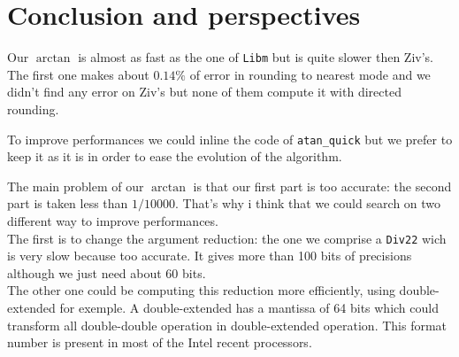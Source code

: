 \section{Conclusion and perspectives}

Our $\arctan$ is almost as fast as the one of \texttt{Libm} but is quite
slower then Ziv's. The first one makes about $0.14\%$ of error in rounding
to nearest mode and we didn't find any error on Ziv's but none of them
compute it with directed rounding.

To improve performances we could inline the code of \texttt{atan\_quick}
but we prefer to keep it as it is in order to ease the evolution of the
algorithm.

The main problem of our $\arctan$ is that our first part is too accurate:
the second part is taken less than $1/10000$. That's why i think that we
could search on two different way to improve performances. \\ The first is
to change the argument reduction: the one we comprise a \texttt{Div22} wich
is very slow because too accurate. It gives more than 100 bits of
precisions although we just need about 60 bits. \\The other one could be
computing this reduction more efficiently, using double-extended for
exemple. A double-extended has a mantissa of 64 bits which could transform
all double-double operation in double-extended operation. This format
number is present in most of the Intel recent processors.
